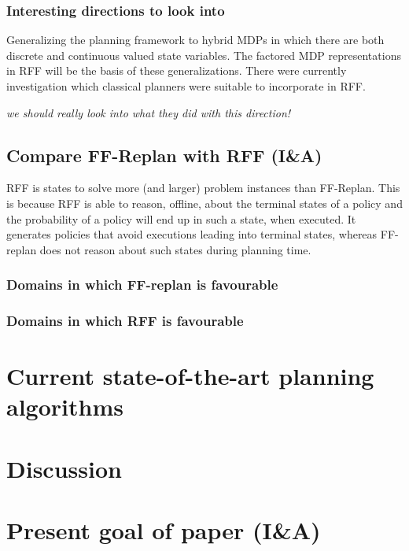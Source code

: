 \documentclass[runningheads,a4paper]{llncs}
\begin{document}
\subsubsection{Interesting directions to look into}

Generalizing the planning framework to hybrid MDPs in which there are both discrete and continuous valued state variables. The factored MDP representations in RFF will be the basis of these generalizations. There were currently investigation which classical planners were suitable to incorporate in RFF.

\emph{we should really look into what they did with this direction!}

\subsection{Compare FF-Replan with RFF (I\&A)}
RFF is states to solve more (and larger) problem instances than FF-Replan. This is because RFF is able to reason, offline, about the terminal states of a policy and the probability of a policy will end up in such a state, when executed. It generates policies that avoid executions leading into terminal states, whereas FF-replan does not reason about such states during planning time.

\subsubsection{Domains in which FF-replan is favourable}

\subsubsection{Domains in which RFF is favourable}


\section{Current state-of-the-art planning algorithms}

\section{Discussion}

\section{Present goal of paper (I\&A)}



\end{document}

